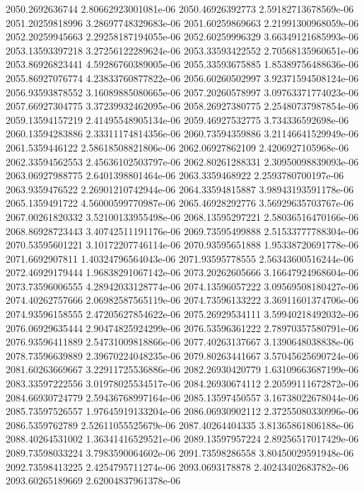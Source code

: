 {2050.2692636744 2.80662923001081e-06
2050.46926392773 2.59182713678569e-06
2051.20259818996 3.28697748329683e-06
2051.60259869663 2.21991300968059e-06
2052.20259945663 2.29258187194055e-06
2052.60259996329 3.66349121685993e-06
2053.13593397218 3.27256122289624e-06
2053.33593422552 2.70568135960651e-06
2053.86926823441 4.59286760389005e-06
2055.33593675885 1.85389756488636e-06
2055.86927076774 4.23833760877822e-06
2056.60260502997 3.92371594508124e-06
2056.93593878552 3.16089885080665e-06
2057.20260578997 3.09763371774023e-06
2057.66927304775 3.37239932462095e-06
2058.26927380775 2.25480737987854e-06
2059.13594157219 2.41495548905134e-06
2059.46927532775 3.734336592698e-06
2060.13594283886 2.33311174814356e-06
2060.73594359886 3.21146641529949e-06
2061.5359446122 2.58618508821806e-06
2062.06927862109 2.4206927105968e-06
2062.33594562553 2.45636102503797e-06
2062.80261288331 2.30950098839093e-06
2063.06927988775 2.6401398801464e-06
2063.3359468922 2.2593780700197e-06
2063.9359476522 2.26901210742944e-06
2064.33594815887 3.98943193591178e-06
2065.1359491722 4.56000599770987e-06
2065.46928292776 3.56929635703767e-06
2067.00261820332 3.52100133955498e-06
2068.13595297221 2.58036516470166e-06
2068.86928723443 3.40742511191176e-06
2069.73595499888 2.51533777788304e-06
2070.53595601221 3.10172207746114e-06
2070.93595651888 1.95338720691778e-06
2071.6692907811 1.40324796564043e-06
2071.93595778555 2.56343600516244e-06
2072.46929179444 1.96838291067142e-06
2073.20262605666 3.16647924968604e-06
2073.73596006555 4.28942033128774e-06
2074.13596057222 3.09569508180427e-06
2074.40262757666 2.06982587565119e-06
2074.73596133222 3.36911601374706e-06
2074.93596158555 2.47205627854622e-06
2075.26929534111 3.59940218492032e-06
2076.06929635444 2.90474825924299e-06
2076.53596361222 2.78970357580791e-06
2076.93596411889 2.54731009818866e-06
2077.40263137667 3.1390648038838e-06
2078.73596639889 2.39670224048235e-06
2079.80263441667 3.57045625690724e-06
2081.60263669667 3.22911725536886e-06
2082.26930420779 1.63109663687199e-06
2083.33597222556 3.01978025534517e-06
2084.26930674112 2.20599111672872e-06
2084.66930724779 2.59436768997164e-06
2085.13597450557 3.16738022678044e-06
2085.73597526557 1.97645919133204e-06
2086.06930902112 2.37255080330996e-06
2086.5359762789 2.52611055525679e-06
2087.40264404335 3.81365861806188e-06
2088.40264531002 1.36341416529521e-06
2089.13597957224 2.89256517017429e-06
2089.73598033224 3.7983590064602e-06
2091.73598286558 3.80450029591948e-06
2092.73598413225 2.4254795711274e-06
2093.0693178878 2.40243402683782e-06
2093.60265189669 2.62004837961378e-06
}
